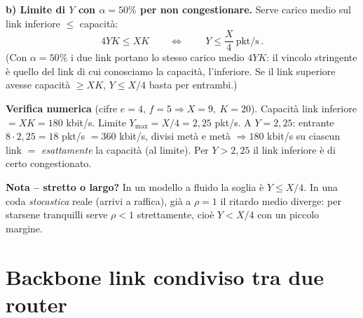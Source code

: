 \documentclass{report}
\begin{document}
\begin{solution}
\medskip
\noindent\textbf{b) Limite di $Y$ con $\alpha=50\%$ per non congestionare.}
Serve carico medio sul link inferiore $\le$ capacità:
\[
4YK \le XK
\qquad\Longleftrightarrow\qquad
\boxed{\,Y \le \dfrac{X}{4}\ \text{pkt/s}\,}.
\]
(Con $\alpha=50\%$ i due link portano lo stesso carico medio $4YK$: il vincolo
stringente è quello del link di cui conosciamo la capacità, l'inferiore. Se il
link superiore avesse capacità $\ge XK$, $Y\le X/4$ basta per entrambi.)

\medskip
\noindent\textbf{Verifica numerica} (cifre $e=4,\,f=5 \Rightarrow X=9,\ K=20$).
Capacità link inferiore $=XK = 180$ kbit/s. Limite $Y_{\max}=X/4 = 2{,}25$ pkt/s.
A $Y=2{,}25$: entrante $8\cdot2{,}25 = 18$ pkt/s $= 360$ kbit/s, divisi metà e metà
$\Rightarrow 180$ kbit/s su ciascun link $=$ \emph{esattamente} la capacità
(al limite). Per $Y>2{,}25$ il link inferiore è di certo congestionato.

\medskip
\textbf{Nota -- stretto o largo?} In un modello a fluido la soglia è $Y\le X/4$. In
una coda \emph{stocastica} reale (arrivi a raffica), già a $\rho=1$ il ritardo
medio diverge: per starsene tranquilli serve $\rho<1$ strettamente, cioè
$Y<X/4$ con un piccolo margine.
\end{solution}



\section{Backbone link condiviso tra due router}
\end{document}
